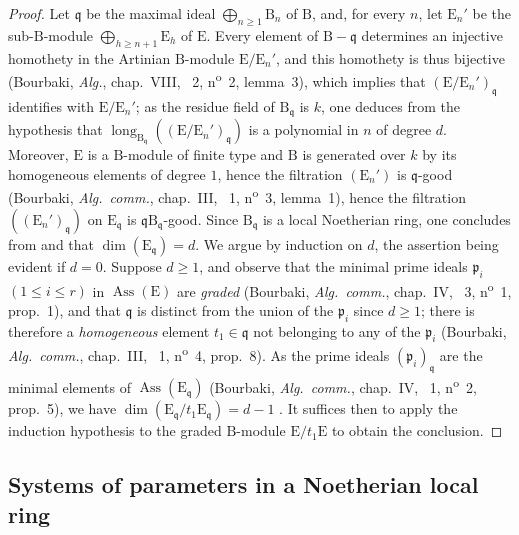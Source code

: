 \begin{proof}
Let $\mathfrak{q}$ be the maximal ideal $\bigoplus_{n\geq 1}\mathrm{B}_n$ of $\mathrm{B}$, and, for every $n$, let $\mathrm{E}_n'$ be the sub-$\mathrm{B}$-module $\bigoplus_{h\geq n+1}\mathrm{E}_h$ of $\mathrm{E}$.
Every element of $\mathrm{B}-\mathfrak{q}$ determines an injective homothety in the Artinian $\mathrm{B}$-module $\mathrm{E}/\mathrm{E}_n'$, and this homothety is thus bijective (Bourbaki, \emph{Alg.}, chap.~VIII, \textsection~2, n\textsuperscript{o}~2, lemma~3), which implies that $(\mathrm{E}/\mathrm{E}_n')_\mathfrak{q}$ identifies with $\mathrm{E}/\mathrm{E}_n'$; as the residue field of $\mathrm{B}_\mathfrak{q}$ is $k$, one deduces from the hypothesis that $\operatorname{long}_{\mathrm{B}_\mathfrak{q}}((\mathrm{E}/\mathrm{E}_n')_\mathfrak{q})$ is a polynomial in $n$ of degree $d$. Moreover, $\mathrm{E}$ is a $\mathrm{B}$-module of finite type and $\mathrm{B}$ is generated over $k$ by its homogeneous elements of degree $1$, hence the filtration $(\mathrm{E}_n')$ is $\mathfrak{q}$-good (Bourbaki, \emph{Alg.~comm.}, chap.~III, \textsection~1, n\textsuperscript{o}~3, lemma~1), hence the filtration $((\mathrm{E}_n')_\mathfrak{q})$ on $\mathrm{E}_\mathfrak{q}$ is $\mathfrak{q}\mathrm{B}_\mathfrak{q}$-good.
Since $\mathrm{B}_\mathfrak{q}$ is a local Noetherian ring, one concludes from  and  that $\dim(\mathrm{E}_\mathfrak{q})=d$. We argue by induction on $d$, the assertion being evident if $d=0$.
Suppose $d\geq 1$, and observe that the minimal prime ideals $\mathfrak{p}_i$ $(1\leq i\leq r)$ in $\operatorname{Ass}(\mathrm{E})$ are \emph{graded} (Bourbaki, \emph{Alg.~comm.}, chap.~IV, \textsection~3, n\textsuperscript{o}~1, prop.~1), and that $\mathfrak{q}$ is distinct from the union of the $\mathfrak{p}_i$ since $d\geq 1$; there is therefore a \emph{homogeneous} element $t_1\in\mathfrak{q}$ not belonging to any of the $\mathfrak{p}_i$ (Bourbaki, \emph{Alg.~comm.}, chap.~III, \textsection~1, n\textsuperscript{o}~4, prop.~8).
As the prime ideals $(\mathfrak{p}_i)_\mathfrak{q}$ are the minimal elements of $\operatorname{Ass}(\mathrm{E}_\mathfrak{q})$ (Bourbaki, \emph{Alg.~comm.}, chap.~IV, \textsection~1, n\textsuperscript{o}~2, prop.~5), we have $\dim(\mathrm{E}_\mathfrak{q}/t_1\mathrm{E}_\mathfrak{q})=d-1$ .
It suffices then to apply the induction hypothesis to the graded $\mathrm{B}$-module $\mathrm{E}/t_1\mathrm{E}$ to obtain the conclusion.
\end{proof}

\subsection{Systems of parameters in a Noetherian local ring}
\label{subsection:0.16.3}


